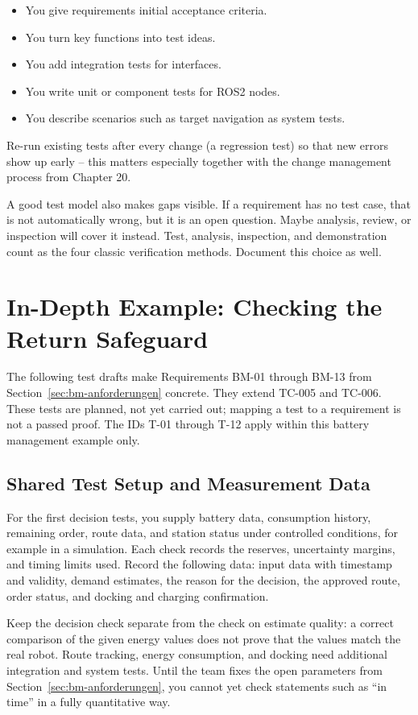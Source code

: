 \begin{itemize}
    \item You give requirements initial acceptance criteria.
    \item You turn key functions into test ideas.
    \item You add integration tests for interfaces.
    \item You write unit or component tests for ROS2 nodes.
    \item You describe scenarios such as target navigation as system tests.
\end{itemize}

Re-run existing tests after every change (a regression test) so that new errors show up early -- this matters especially together with the change management process from Chapter 20.

A good test model also makes gaps visible. If a requirement has no test case, that is not automatically wrong, but it is an open question. Maybe analysis, review, or inspection will cover it instead. Test, analysis, inspection, and demonstration count as the four classic verification methods. Document this choice as well.

\section{In-Depth Example: Checking the Return Safeguard}
\label{sec:bm-tests}
The following test drafts make Requirements BM-01 through BM-13 from Section~\ref{sec:bm-anforderungen} concrete. They extend TC-005 and TC-006. These tests are planned, not yet carried out; mapping a test to a requirement is not a passed proof. The IDs T-01 through T-12 apply within this battery management example only.

\subsection{Shared Test Setup and Measurement Data}
For the first decision tests, you supply battery data, consumption history, remaining order, route data, and station status under controlled conditions, for example in a simulation. Each check records the reserves, uncertainty margins, and timing limits used. Record the following data: input data with timestamp and validity, demand estimates, the reason for the decision, the approved route, order status, and docking and charging confirmation.

Keep the decision check separate from the check on estimate quality: a correct comparison of the given energy values does not prove that the values match the real robot. Route tracking, energy consumption, and docking need additional integration and system tests. Until the team fixes the open parameters from Section~\ref{sec:bm-anforderungen}, you cannot yet check statements such as \enquote{in time} in a fully quantitative way.

